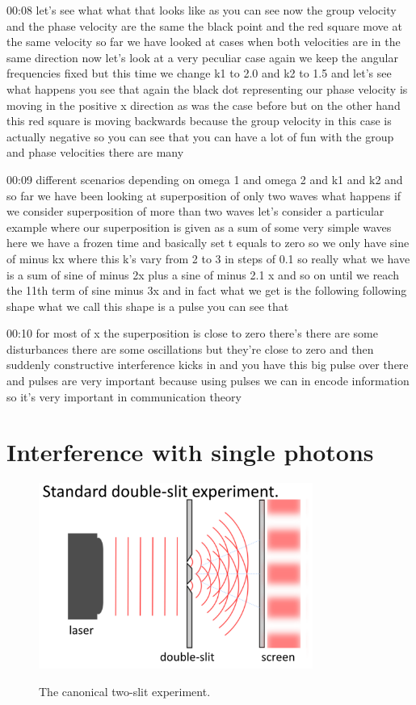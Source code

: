 00:08
let's see what what that looks like as you can see
now the group velocity and the phase velocity are the same
the black point and the red square move at the same velocity
so far we have looked at cases when both velocities
are in the same direction now let's look at a very peculiar case
again we keep the angular frequencies fixed but this time we change k1 to 2.0
and k2 to 1.5 and let's see what happens you see that again the black dot
representing our phase velocity is moving in the positive x direction
as was the case before but on the other hand this red square
is moving backwards because the group velocity in this case
is actually negative so you can see that
you can have a lot of fun with the group and phase velocities there are many

00:09
different scenarios depending on omega 1 and omega 2 and k1 and k2
and so far we have been looking at superposition of only two waves
what happens if we consider superposition of more than two waves
let's consider a particular example where our superposition
is given as a sum of some very simple waves
here we have a frozen time and basically set t equals to zero
so we only have sine of minus kx where this k's vary from 2 to 3 in steps of 0.1
so really what we have is a sum of sine of minus 2x plus a sine of minus 2.1
x and so on until we reach the 11th term of sine minus 3x
and in fact what we get is the following following shape
what we call this shape is a pulse you can see that

00:10
for most of x the superposition is close to zero there's there are some
disturbances there are some oscillations but they're
close to zero and then suddenly constructive interference kicks in and
you have this big pulse over there and pulses are very important because
using pulses we can in encode information so it's
very important in communication theory

\section{Interference with single photons}

\begin{figure}[H]
   \centering
    \includegraphics[width=0.8\textwidth]{lesson6/standard_double_slit.pdf}
    \label{fig: 1}
    
        \caption{The canonical two-slit experiment.}
    
\end{figure}

